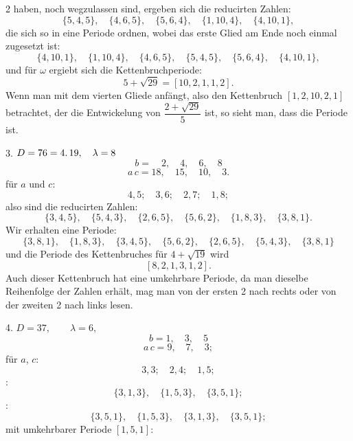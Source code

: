 2 haben, noch wegzulassen sind, ergeben sich die reducirten
Zahlen:
\[
\{5, 4, 5\}, \quad \{4, 6, 5\}, \quad \{5, 6, 4\}, \quad \{1, 10, 4\}, \quad \{4, 10, 1\},
\]
die sich so in eine Periode ordnen, wobei das erste Glied am
Ende noch einmal zugesetzt ist:
\[
\{4, 10, 1\}, \quad \{1, 10, 4\}, \quad \{4, 6, 5\}, \quad \{5, 4, 5\}, \quad \{5, 6, 4\}, \quad \{4, 10, 1\},
\]
und für $\omega$ ergiebt sich die Kettenbruchperiode:
\[
5 + \sqrt{29} = [10, 2, 1, 1, 2].
\]
Wenn man mit dem vierten Gliede anfängt, also den Kettenbruch
$[1, 2, 10, 2, 1]$ betrachtet, der die Entwickelung von $\dfrac{2 + \sqrt{29}}{5}$
ist, so sieht man, dass die Periode  ist.

3. $D = 76 = 4 \ldotp 19, \quad \lambda = 8$
\[
b = \quad 2, \quad 4, \quad 6, \quad 8
\]
\[
a\,c = 18, \quad 15, \quad 10, \quad 3.
\]
 für $a$ und $c$:
\[
4, 5; \quad 3, 6; \quad 2, 7; \quad 1, 8;
\]
also sind die reducirten Zahlen:
\[
\{3, 4, 5\}, \quad \{5, 4, 3\}, \quad \{2, 6, 5\}, \quad \{5, 6, 2\}, \quad \{1, 8, 3\}, \quad \{3, 8, 1\}.
\]
Wir erhalten eine Periode:
\[
\{3, 8, 1\}, \quad \{1, 8, 3\}, \quad \{3, 4, 5\}, \quad \{5, 6, 2\}, \quad \{2, 6, 5\}, \quad \{5, 4, 3\}, \quad \{3, 8, 1\}
\]
und die Periode des Kettenbruches für $4 + \sqrt{19}$ wird
\[
[8, 2, 1, 3, 1, 2].
\]
Auch dieser Kettenbruch hat eine umkehrbare Periode, da
man dieselbe Reihenfolge der Zahlen erhält, mag man von der
ersten 2 nach rechts oder von der zweiten 2 nach links lesen.

4. $D = 37, \qquad \lambda = 6,$
\[
b = 1, \quad 3, \quad 5
\]
\[
a\,c = 9, \quad 7, \quad 3;
\]
 für $a$, $c$:
\[
3, 3; \quad 2, 4; \quad 1, 5;
\]
:
\[
\{3, 1, 3\}, \quad \{1, 5, 3\}, \quad \{3, 5, 1\};
\]
:
\[
\{3, 5, 1\}, \quad \{1, 5, 3\}, \quad \{3, 1, 3\}, \quad \{3, 5, 1\};
\]
 mit umkehrbarer Periode $[1, 5, 1]$:
